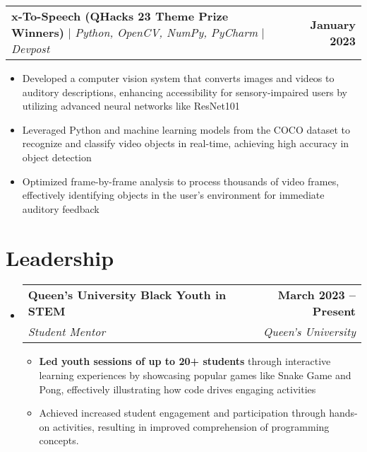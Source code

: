 \documentclass[letterpaper,11pt]{article}
\makeatletter
\newcommand{\resumeItem}[1]{
  \item\small{
    {#1 \vspace{-2pt}}
  }
}
\newcommand{\resumeSubheading}[4]{
  \vspace{-2pt}\item
    \begin{tabular*}{1.0\textwidth}[t]{l@{\extracolsep{\fill}}r}
      \textbf{#1} & \textbf{\small #2} \\
      \textit{\small#3} & \textit{\small #4} \\
    \end{tabular*}\vspace{-7pt}
}
\newcommand{\resumeProjectHeading}[2]{
    \item
    \begin{tabular*}{1.001\textwidth}{l@{\extracolsep{\fill}}r}
      \small#1 & \textbf{\small #2}\\
    \end{tabular*}\vspace{-7pt}
}
\newcommand{\resumeSubHeadingListStart}{\begin{itemize}[leftmargin=0.0in, label={}]}
\newcommand{\resumeSubHeadingListEnd}{\end{itemize}}
\newcommand{\resumeItemListStart}{\begin{itemize}}
\newcommand{\resumeItemListEnd}{\end{itemize}\vspace{-5pt}}
\makeatother
\begin{document}
          \vspace{-13pt}
        \resumeProjectHeading
        {{\textbf{x-To-Speech (QHacks 23 Theme Prize Winners)}} $|$ \emph{Python, OpenCV, NumPy, PyCharm} $|$ \emph{Devpost}}{January 2023}
          \resumeItemListStart
            \resumeItem{Developed a computer vision system that converts images and videos to auditory descriptions, enhancing accessibility for sensory-impaired users by utilizing advanced neural networks like ResNet101}
            \resumeItem{Leveraged Python and machine learning models from the COCO dataset to recognize and classify video objects in real-time, achieving high accuracy in object detection}
            \resumeItem{Optimized frame-by-frame analysis to process thousands of video frames, effectively identifying objects in the user's environment for immediate auditory feedback}
          \resumeItemListEnd
          \vspace{-13pt}

\section{Leadership}
    \resumeSubHeadingListStart
        \resumeSubheading{Queen's University Black Youth in STEM}{March 2023 -- Present}{Student Mentor}{Queen's University}
            \resumeItemListStart
                \resumeItem{\textbf{Led youth sessions of up to 20+ students} through interactive learning experiences by showcasing popular games like Snake Game and Pong, effectively illustrating how code drives engaging activities}
                \resumeItem{Achieved increased student engagement and participation through hands-on activities, resulting in improved comprehension of programming concepts.}
            \resumeItemListEnd
        
    \resumeSubHeadingListEnd


\end{document}
